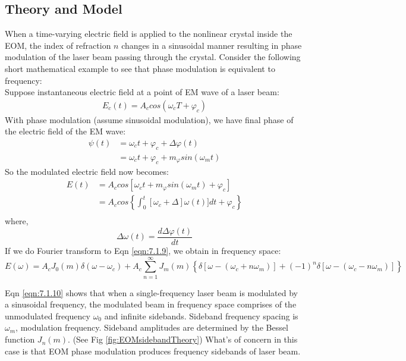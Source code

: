 \documentclass[11pt,A4Paper]{article}
\begin{document}
\subsection{Theory and Model}
When a time-varying electric field is applied to the nonlinear crystal inside the EOM, the index of refraction $n$ changes in a sinusoidal manner resulting in phase modulation of the laser beam passing through the crystal. Consider the following short mathematical example to see that phase modulation is equivalent to frequency: 
\\
Suppose instantaneous electric field at a point of EM wave of a laser beam: 
\begin{align*}
    E_c(t) = A_c cos(\omega_c T + \varphi_c)
\end{align*}
With phase modulation (assume sinusoidal modulation), we have final phase of the electric field of the EM wave: 
\begin{align*}
    \psi(t) &= \omega_c t + \varphi_c + \Delta \varphi (t) \\
            &= \omega_c t + \varphi_c + m_{\varphi} sin(\omega_m t)
\end{align*}
So the modulated electric field now becomes: 
\begin{align}
    E(t) &= A_c cos[ \omega_c t + m_{\varphi} sin(\omega_m t) + \varphi_c] \label{eqn:7.1.9}\\
         &= A_c cos\left\{  \int_0^t [ \omega_c + \Delta ]\omega(t)] dt + \varphi_c \right\} \\
\end{align}
where, 
\begin{equation*}
    \Delta \omega (t) = \frac{d\Delta \varphi (t)}{dt}
\end{equation*}
If we do Fourier transform to Eqn \ref{eqn:7.1.9}, we obtain in frequency space: 
\begin{equation}
    E(\omega) = A_c J_0(m) \delta(\omega - \omega_c) + A_c\sum_{n=1}^\infty J_m(m) \left\{ \delta[\omega-(\omega_c + n\omega_m)] +(-1)^n\delta[\omega-(\omega_c-n\omega_m)]\right\}
    \label{eqn:7.1.10}
\end{equation}

Eqn \ref{eqn:7.1.10} shows that when a single-frequency laser beam is modulated by a sinusoidal frequency, the modulated beam in frequency space comprises of the unmodulated frequency $\omega_0$ and infinite sidebands. Sideband frequency spacing is $\omega_m$, modulation frequency. 
Sideband amplitudes are determined by the Bessel function $J_n(m)$. (See Fig \ref{fig:EOMsidebandTheory}) What's of concern in this case is that EOM phase modulation produces frequency sidebands of laser beam. 
\end{document}
